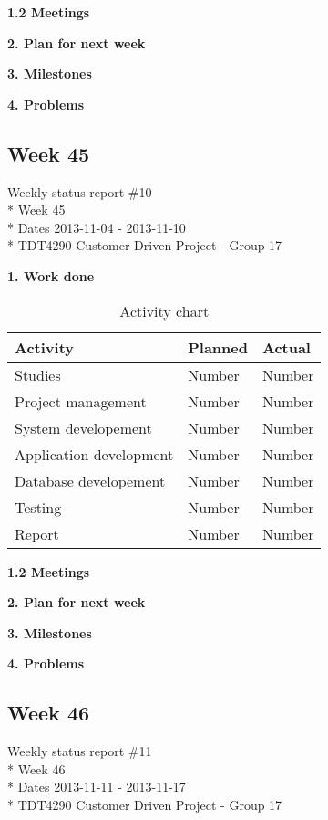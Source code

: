 \textbf{1.2 Meetings}

\textbf{2. Plan for next week}

\textbf{3. Milestones}

\textbf{4. Problems}

\newpage
\subsection{Week 45}

\begin{center}
Weekly status report \#10\\*
Week 45 \\*
Dates 2013-11-04 - 2013-11-10 \\*
TDT4290 Customer Driven Project - Group 17
\end{center}

\textbf{1. Work done}

\begin{table}[H]
\begin{center}
\begin{tabular}{ l | l | l }
  \hline
  Activity & Planned & Actual \\
  \hline\noalign{\smallskip}\noalign{\smallskip}\hline
  Studies & Number & Number \\
  Project management & Number & Number \\
  System developement & Number & Number \\
  Application development & Number & Number \\
  Database developement & Number & Number \\
  Testing & Number & Number \\
  Report & Number & Number \\
  \hline
\end{tabular}
\end{center}
\caption{Activity chart}
\label{table:activityChartStatusReport}
\end{table}

\textbf{1.2 Meetings}

\textbf{2. Plan for next week}

\textbf{3. Milestones}

\textbf{4. Problems}

\newpage
\subsection{Week 46}

\begin{center}
Weekly status report \#11\\*
Week 46 \\*
Dates 2013-11-11 - 2013-11-17 \\*
TDT4290 Customer Driven Project - Group 17
\end{center}

